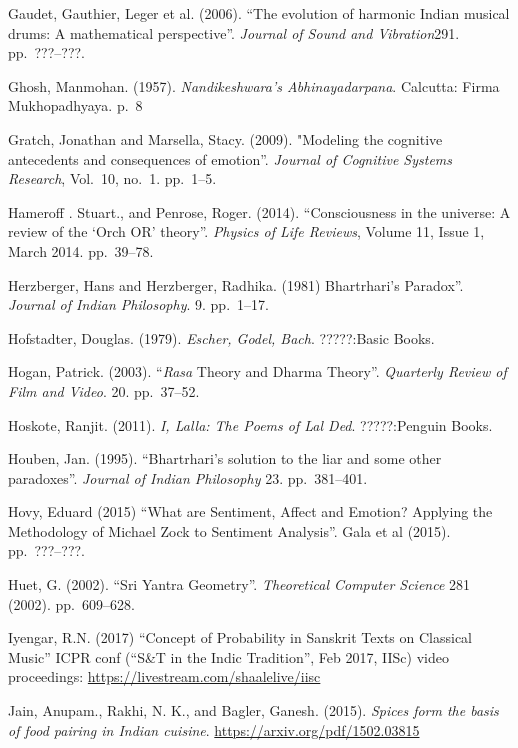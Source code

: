 \begin{thebibliography}{99}
Gaudet, Gauthier, Leger et al. (2006). “The evolution of harmonic Indian musical drums: A mathematical perspective”. \textsl{Journal of Sound and Vibration}291. pp.~???--???.

Ghosh, Manmohan. (1957). \textsl{Nandikeshwara’s Abhinayadarpana}. Calcutta: Firma Mukhopadhyaya. p.~8

Gratch, Jonathan and Marsella, Stacy. (2009). "Modeling the cognitive antecedents and consequences of emotion”. \textsl{Journal of Cognitive Systems Research}, Vol.~10, no.~1. pp.~1--5.

Hameroff . Stuart., and Penrose, Roger. (2014). “Consciousness in the universe: A review of the ‘Orch OR’ theory”. \textsl{Physics of Life Reviews}, Volume 11, Issue 1, March 2014. pp.~39--78.

Herzberger, Hans and Herzberger, Radhika. (1981) Bhartrhari’s Paradox”. \textsl{Journal of Indian Philosophy}. 9. pp.~1--17.

Hofstadter, Douglas. (1979). \textsl{Escher, Godel, Bach}. ?????:Basic Books.

Hogan, Patrick. (2003). “\textsl{Rasa} Theory and Dharma Theory”. \textsl{Quarterly Review of Film and Video}. 20. pp.~37--52.

Hoskote, Ranjit. (2011). \textsl{I, Lalla: The Poems of Lal Ded}. ?????:Penguin Books.

Houben, Jan. (1995). “Bhartrhari’s solution to the liar and some other paradoxes”. \textsl{Journal of Indian Philosophy} 23. pp.~381--401.

Hovy, Eduard (2015) “What are Sentiment, Affect and Emotion? Applying the Methodology of Michael Zock to Sentiment Analysis”. Gala et al (2015). pp.~???--???.

Huet, G. (2002). “Sri Yantra Geometry”. \textsl{Theoretical Computer Science} 281 (2002). pp.~609--628.

Iyengar, R.N. (2017) “Concept of Probability in Sanskrit Texts on Classical Music” ICPR conf (“S\&T in the Indic Tradition”, Feb 2017, IISc) video proceedings: \url{https://livestream.com/shaalelive/iisc}

Jain, Anupam., Rakhi, N. K., and Bagler, Ganesh. (2015). \textsl{Spices form the basis of food pairing in Indian cuisine}. \url{https://arxiv.org/pdf/1502.03815}


\end{thebibliography}
